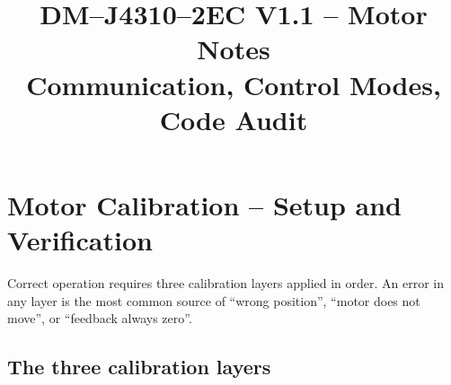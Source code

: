 \documentclass[11pt,a4paper]{article}
\title{DM--J4310--2EC V1.1 -- Motor Notes\\
\large Communication, Control Modes, Code Audit}
\author{}
\date{}
\begin{document}
\maketitle

\section{Motor Calibration -- Setup and Verification}
\label{sec:calibration}

Correct operation requires three calibration layers applied in order.
An error in any layer is the most common source of ``wrong position'',
``motor does not move'', or ``feedback always zero''.

\subsection{The three calibration layers}
\end{document}
